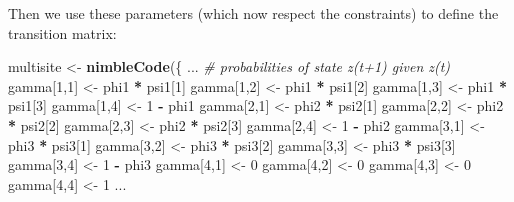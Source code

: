 \documentclass[
  12pt,
]{krantz}
\newenvironment{Shaded}{\begin{snugshade}}{\end{snugshade}}
\newcommand{\CommentTok}[1]{\textcolor[rgb]{0.56,0.35,0.01}{\textit{#1}}}
\newcommand{\DecValTok}[1]{\textcolor[rgb]{0.00,0.00,0.81}{#1}}
\newcommand{\FunctionTok}[1]{\textcolor[rgb]{0.13,0.29,0.53}{\textbf{#1}}}
\newcommand{\NormalTok}[1]{#1}
\newcommand{\OtherTok}[1]{\textcolor[rgb]{0.56,0.35,0.01}{#1}}
\newcommand{\SpecialCharTok}[1]{\textcolor[rgb]{0.81,0.36,0.00}{\textbf{#1}}}
\begin{document}
Then we use these parameters (which now respect the constraints) to define the transition matrix:

\begin{Shaded}
\begin{Highlighting}[]
\NormalTok{multisite }\OtherTok{\textless{}{-}} \FunctionTok{nimbleCode}\NormalTok{(\{}
\NormalTok{...}
  \CommentTok{\# probabilities of state z(t+1) given z(t)}
\NormalTok{  gamma[}\DecValTok{1}\NormalTok{,}\DecValTok{1}\NormalTok{] }\OtherTok{\textless{}{-}}\NormalTok{ phi1 }\SpecialCharTok{*}\NormalTok{ psi1[}\DecValTok{1}\NormalTok{]}
\NormalTok{  gamma[}\DecValTok{1}\NormalTok{,}\DecValTok{2}\NormalTok{] }\OtherTok{\textless{}{-}}\NormalTok{ phi1 }\SpecialCharTok{*}\NormalTok{ psi1[}\DecValTok{2}\NormalTok{]}
\NormalTok{  gamma[}\DecValTok{1}\NormalTok{,}\DecValTok{3}\NormalTok{] }\OtherTok{\textless{}{-}}\NormalTok{ phi1 }\SpecialCharTok{*}\NormalTok{ psi1[}\DecValTok{3}\NormalTok{]}
\NormalTok{  gamma[}\DecValTok{1}\NormalTok{,}\DecValTok{4}\NormalTok{] }\OtherTok{\textless{}{-}} \DecValTok{1} \SpecialCharTok{{-}}\NormalTok{ phi1}
\NormalTok{  gamma[}\DecValTok{2}\NormalTok{,}\DecValTok{1}\NormalTok{] }\OtherTok{\textless{}{-}}\NormalTok{ phi2 }\SpecialCharTok{*}\NormalTok{ psi2[}\DecValTok{1}\NormalTok{]}
\NormalTok{  gamma[}\DecValTok{2}\NormalTok{,}\DecValTok{2}\NormalTok{] }\OtherTok{\textless{}{-}}\NormalTok{ phi2 }\SpecialCharTok{*}\NormalTok{ psi2[}\DecValTok{2}\NormalTok{]}
\NormalTok{  gamma[}\DecValTok{2}\NormalTok{,}\DecValTok{3}\NormalTok{] }\OtherTok{\textless{}{-}}\NormalTok{ phi2 }\SpecialCharTok{*}\NormalTok{ psi2[}\DecValTok{3}\NormalTok{]}
\NormalTok{  gamma[}\DecValTok{2}\NormalTok{,}\DecValTok{4}\NormalTok{] }\OtherTok{\textless{}{-}} \DecValTok{1} \SpecialCharTok{{-}}\NormalTok{ phi2}
\NormalTok{  gamma[}\DecValTok{3}\NormalTok{,}\DecValTok{1}\NormalTok{] }\OtherTok{\textless{}{-}}\NormalTok{ phi3 }\SpecialCharTok{*}\NormalTok{ psi3[}\DecValTok{1}\NormalTok{]}
\NormalTok{  gamma[}\DecValTok{3}\NormalTok{,}\DecValTok{2}\NormalTok{] }\OtherTok{\textless{}{-}}\NormalTok{ phi3 }\SpecialCharTok{*}\NormalTok{ psi3[}\DecValTok{2}\NormalTok{]}
\NormalTok{  gamma[}\DecValTok{3}\NormalTok{,}\DecValTok{3}\NormalTok{] }\OtherTok{\textless{}{-}}\NormalTok{ phi3 }\SpecialCharTok{*}\NormalTok{ psi3[}\DecValTok{3}\NormalTok{]}
\NormalTok{  gamma[}\DecValTok{3}\NormalTok{,}\DecValTok{4}\NormalTok{] }\OtherTok{\textless{}{-}} \DecValTok{1} \SpecialCharTok{{-}}\NormalTok{ phi3}
\NormalTok{  gamma[}\DecValTok{4}\NormalTok{,}\DecValTok{1}\NormalTok{] }\OtherTok{\textless{}{-}} \DecValTok{0}
\NormalTok{  gamma[}\DecValTok{4}\NormalTok{,}\DecValTok{2}\NormalTok{] }\OtherTok{\textless{}{-}} \DecValTok{0}
\NormalTok{  gamma[}\DecValTok{4}\NormalTok{,}\DecValTok{3}\NormalTok{] }\OtherTok{\textless{}{-}} \DecValTok{0}
\NormalTok{  gamma[}\DecValTok{4}\NormalTok{,}\DecValTok{4}\NormalTok{] }\OtherTok{\textless{}{-}} \DecValTok{1}
\NormalTok{...}
\end{Highlighting}
\end{Shaded}
\end{document}
